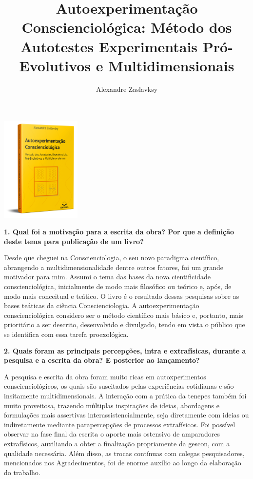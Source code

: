 \documentclass{gescons}
\author{Alexandre Zaslavksy}
\title{Autoexperimentação Conscienciológica: Método dos Autotestes Experimentais Pró-Evolutivos e Multidimensionais}
\begin{document}
    \makeentrevistatitle

    
    \begin{multicols}{2}

\begin{center}
    \includegraphics[width=4cm]{articles/entrevista/mockups/Alexandre-Zas.png}
\end{center}

\textbf{1. Qual foi a motivação para a escrita da obra? Por que a definição deste tema para publicação de um livro?}

Desde que cheguei na Conscienciologia, o seu novo paradigma científico, abrangendo a multidimensionalidade dentre outros fatores, foi um grande motivador para mim. Assumi o tema das bases da nova cientificidade conscienciológica, inicialmente de modo mais filosófico ou teórico e, após, de modo mais conceitual e teático. O livro é o resultado dessas pesquisas sobre as bases teáticas da ciência Conscienciologia. A autoexperimentação conscienciológica considero ser o método científico mais básico e, portanto, mais prioritário a ser descrito, desenvolvido e divulgado, tendo em vista o público que se identifica com essa tarefa proexológica.

\textbf{2.       Quais foram as principais percepções, intra e extrafísicas, durante a pesquisa e a escrita da obra? E posterior ao lançamento?}

A pesquisa e escrita da obra foram muito ricas em autoxperimentos conscienciológicos, os quais são suscitados pelas experiências cotidianas e são insitamente multidimensionais. A interação com a prática da tenepes também foi muito proveitosa, trazendo múltiplas inspirações de ideias, abordagens e formulações mais assertivas interassistencialmente, seja diretamente com ideias ou indiretamente mediante parapercepções de processos extrafísicos. Foi possível observar na fase final da escrita o aporte mais ostensivo de amparadores extrafísicos, auxiliando a obter a finalização propriamente da gescon, com a qualidade necessária. Além disso, as trocas contínuas com colegas pesquisadores, mencionados nos Agradecimentos, foi de enorme auxílio ao longo da elaboração do trabalho.




\end{multicols}
\end{document}
